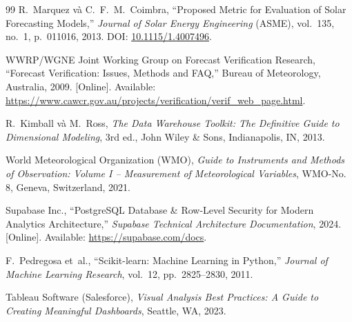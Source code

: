 \documentclass[12pt, a4paper]{report}
\begin{document}
\begin{thebibliography}{99}
R.~Marquez và C.~F.~M.~Coimbra,
\newblock ``Proposed Metric for Evaluation of Solar Forecasting Models,''
\newblock \textit{Journal of Solar Energy Engineering} (ASME), vol.~135, no.~1, p.~011016, 2013.
\newblock DOI: \href{https://doi.org/10.1115/1.4007496}{10.1115/1.4007496}.

WWRP/WGNE Joint Working Group on Forecast Verification Research,
\newblock ``Forecast Verification: Issues, Methods and FAQ,''
\newblock Bureau of Meteorology, Australia, 2009. [Online]. Available: \url{https://www.cawcr.gov.au/projects/verification/verif_web_page.html}.

R.~Kimball và M.~Ross,
\newblock \textit{The Data Warehouse Toolkit: The Definitive Guide to Dimensional Modeling}, 3rd ed.,
\newblock John Wiley \& Sons, Indianapolis, IN, 2013.

World Meteorological Organization (WMO),
\newblock \textit{Guide to Instruments and Methods of Observation: Volume I -- Measurement of Meteorological Variables},
\newblock WMO-No. 8, Geneva, Switzerland, 2021.

Supabase Inc.,
\newblock ``PostgreSQL Database \& Row-Level Security for Modern Analytics Architecture,''
\newblock \textit{Supabase Technical Architecture Documentation}, 2024. [Online]. Available: \url{https://supabase.com/docs}.

F.~Pedregosa et~al.,
\newblock ``Scikit-learn: Machine Learning in Python,''
\newblock \textit{Journal of Machine Learning Research}, vol.~12, pp.~2825--2830, 2011.

Tableau Software (Salesforce),
\newblock \textit{Visual Analysis Best Practices: A Guide to Creating Meaningful Dashboards},
\newblock Seattle, WA, 2023.

\end{thebibliography}
\end{document}
